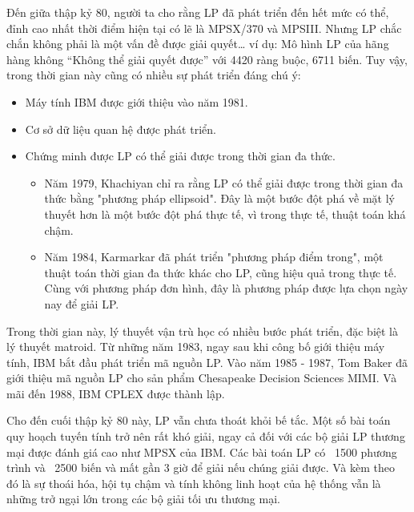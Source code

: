 Đến giữa thập kỷ 80, người ta cho rằng LP đã phát triển đến hết mức có thể, đỉnh cao nhất thời điểm hiện tại có lẽ là MPSX/370 và MPSIII. Nhưng LP chắc chắn không phải là một vấn đề được giải quyết… ví dụ: Mô hình LP của hãng hàng không “Không thể giải quyết được” với 4420 ràng buộc, 6711 biến. Tuy vậy, trong thời gian này cũng có nhiều sự phát triển đáng chú ý:
\begin{itemize}
    \item Máy tính IBM được giới thiệu vào năm 1981.
    \item Cơ sở dữ liệu quan hệ được phát triển.
    \item Chứng minh được LP có thể giải được trong thời gian đa thức.
    \begin{itemize}
        \item Năm 1979, Khachiyan chỉ ra rằng LP có thể giải được trong thời gian đa thức bằng "phương pháp ellipsoid". Đây là một bước đột phá về mặt lý thuyết hơn là một bước đột phá thực tế, vì trong thực tế, thuật toán khá chậm.
        \item Năm 1984, Karmarkar đã phát triển "phương pháp điểm trong", một thuật toán thời gian đa thức khác cho LP, cũng hiệu quả trong thực tế. Cùng với phương pháp đơn hình, đây là phương pháp được lựa chọn ngày nay để giải LP.
    \end{itemize}
\end{itemize}

Trong thời gian này, lý thuyết vận trù học có nhiều bước phát triển, đặc biệt là lý thuyết matroid. Từ những năm 1983, ngay sau khi công bố giới thiệu máy tính, IBM bắt đầu phát triển mã nguồn LP. Vào năm 1985 - 1987, Tom Baker đã giới thiệu mã nguồn LP cho sản phẩm Chesapeake Decision Sciences MIMI. Và mãi đến 1988, IBM CPLEX được thành lập. 

Cho đến cuối thập kỷ 80 này, LP vẫn chưa thoát khỏi bế tắc. Một số bài toán quy hoạch tuyến tính trở nên rất khó giải, ngay cả đối với các bộ giải LP thương mại được đánh giá cao như MPSX của IBM. Các bài toán LP có ~1500 phương trình và ~2500 biến và mất gần 3 giờ để giải nếu chúng giải được. Và kèm theo đó là sự thoái hóa, hội tụ chậm và tính không linh hoạt của hệ thống vẫn là những trở ngại lớn trong các bộ giải tối ưu thương mại.

